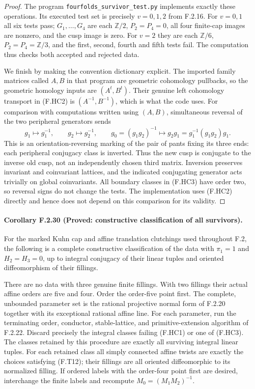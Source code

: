 \begin{proof}
The program \texttt{fourfolds\_survivor\_test.py}
implements exactly these operations.
Its executed test set is precisely $v=0,1,2$ from
F.2.16.  For $v=0,1$ all six tests pass;
$G_1,\ldots,G_4$ are each $\mathbb Z/2$,
$P_2=P_4=0$, all four finite-cap images are nonzero,
and the cusp image is zero.
For $v=2$ they are each $\mathbb Z/6$,
$P_2=P_4=\mathbb Z/3$, and the first, second,
fourth and fifth tests fail.  The computation thus
checks both accepted and rejected data.

We finish by making the convention dictionary explicit.
The imported family matrices called $A,B$ in that
program are geometric cohomology pullbacks, so the
geometric homology inputs are $(A^t,B^t)$.
Their genuine left cohomology transport in (F.HC2)
is $(A^{-1},B^{-1})$, which is what the code uses.
For comparison with computations written using
$(A,B)$, simultaneous reversal of the two peripheral
generators sends
\[
 g_1\mapsto g_1^{-1},\qquad
 g_2\mapsto g_2^{-1},\qquad
 g_0=(g_1g_2)^{-1}\mapsto
     g_2g_1=g_1^{-1}(g_1g_2)g_1 .
 \tag{F.HC12}
\]
This is an orientation-reversing marking of the
pair of pants fixing its three ends: each peripheral
conjugacy class is inverted.
Thus the new cusp is conjugate to the inverse old
cusp, not an independently chosen third matrix.
Inversion preserves invariant and coinvariant
lattices, and the indicated conjugating generator
acts trivially on global coinvariants.
All boundary classes in (F.HC3) have order two, so
reversal signs do not change the tests.
The implementation uses (F.HC2) directly and hence
does not depend on this comparison for its validity.
\end{proof}

\paragraph{Corollary F.2.30 (Proved: constructive classification of all survivors).}
For the marked Kuhn cap and affine translation clutchings
used throughout F.2, the following is a complete constructive
classification of the data with
$\pi_1=1$ and $H_2=H_3=0$, up to integral conjugacy of their
linear tuples and oriented diffeomorphism of their fillings.

There are no data with three genuine finite fillings.
With two fillings their actual affine orders are five and
four.  Order the order-five point first.
The complete, unbounded parameter set is the rational
projective normal form of F.2.20 together with its
exceptional rational affine line.
For each parameter, run the terminating order,
conductor, stable-lattice, and primitive-extension algorithm
of F.2.22.  Discard precisely the integral classes failing
(F.HC1) or one of (F.HC3).
The classes retained by this procedure are exactly all
surviving integral linear tuples.
For each retained class all simply connected affine
twists are exactly the choices satisfying (F.T12);
their fillings are all oriented diffeomorphic to its
normalized filling.
If ordered labels with the order-four point first are
desired, interchange the finite labels and recompute
$M_0=(M_1M_2)^{-1}$.

